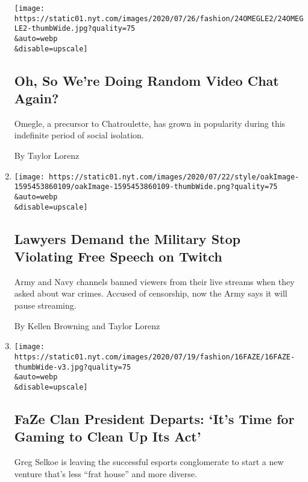 \begin{enumerate}
  \texttt{[image: https://static01.nyt.com/images/2020/07/26/fashion/24OMEGLE2/24OMEGLE2-thumbWide.jpg?quality=75\\\&auto=webp\\\&disable=upscale]}

  \hypertarget{oh-so-were-doing-random-video-chat-again}{%
  \subsection{Oh, So We're Doing Random Video Chat
  Again?}\label{oh-so-were-doing-random-video-chat-again}}

  Omegle, a precursor to Chatroulette, has grown in popularity during
  this indefinite period of social isolation.

  By Taylor Lorenz
\item
  \href{/2020/07/22/style/army-gamers-war-crimes-first-amendment.html}{}

  \texttt{[image: https://static01.nyt.com/images/2020/07/22/style/oakImage-1595453860109/oakImage-1595453860109-thumbWide.png?quality=75\\\&auto=webp\\\&disable=upscale]}

  \hypertarget{lawyers-demand-the-military-stop-violating-free-speech-on-twitch}{%
  \subsection{Lawyers Demand the Military Stop Violating Free Speech on
  Twitch}\label{lawyers-demand-the-military-stop-violating-free-speech-on-twitch}}

  Army and Navy channels banned viewers from their live streams when
  they asked about war crimes. Accused of censorship, now the Army says
  it will pause streaming.

  By Kellen Browning and Taylor Lorenz
\item
  \href{/2020/07/16/style/xset-gaming-lifestyle-company-faze-clan.html}{}

  \texttt{[image: https://static01.nyt.com/images/2020/07/19/fashion/16FAZE/16FAZE-thumbWide-v3.jpg?quality=75\\\&auto=webp\\\&disable=upscale]}

  \hypertarget{faze-clan-president-departs-its-time-for-gaming-to-clean-up-its-act}{%
  \subsection{FaZe Clan President Departs: `It's Time for Gaming to
  Clean Up Its
  Act'}\label{faze-clan-president-departs-its-time-for-gaming-to-clean-up-its-act}}

  Greg Selkoe is leaving the successful esports conglomerate to start a
  new venture that's less ``frat house'' and more diverse.


\end{enumerate}
